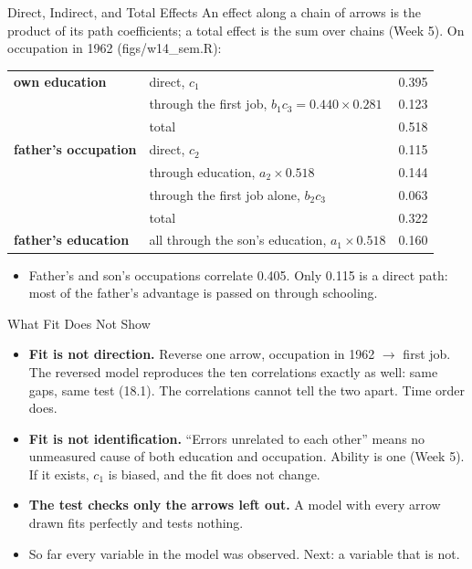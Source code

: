 \documentclass[aspectratio=169,11pt,xcolor=dvipsnames]{beamer}
\newcommand{\srcp}[1]{{\scriptsize\color{gray}(#1)}}
\begin{document}
\begin{frame}{Direct, Indirect, and Total Effects}
An effect along a chain of arrows is the product of its path coefficients; a total effect is the
sum over chains (Week 5). On occupation in 1962 \srcp{figs/w14\_sem.R}:
\begin{center}\small
\renewcommand{\arraystretch}{1.12}
\begin{tabular}{@{}llc@{}}
\toprule
\textbf{own education} & direct, $c_1$ & 0.395 \\
 & through the first job, $b_1 c_3 = 0.440 \times 0.281$ & 0.123 \\
 & total & 0.518 \\
\midrule
\textbf{father's occupation} & direct, $c_2$ & 0.115 \\
 & through education, $a_2 \times 0.518$ & 0.144 \\
 & through the first job alone, $b_2 c_3$ & 0.063 \\
 & total & 0.322 \\
\midrule
\textbf{father's education} & all through the son's education, $a_1 \times 0.518$ & 0.160 \\
\bottomrule
\end{tabular}
\end{center}
\begin{itemize}\itemsep3pt
  \item Father's and son's occupations correlate 0.405. Only 0.115 is a direct path: most of the
        father's advantage is passed on through schooling.
\end{itemize}
\end{frame}

\begin{frame}{What Fit Does Not Show}
\begin{itemize}\itemsep8pt
  \item \textbf{Fit is not direction.} Reverse one arrow, occupation in 1962 $\to$ first job. The
        reversed model reproduces the ten correlations exactly as well: same gaps, same test
        (18.1). The correlations cannot tell the two apart. Time order does.
  \item \textbf{Fit is not identification.} ``Errors unrelated to each other'' means no unmeasured
        cause of both education and occupation. Ability is one (Week 5). If it exists, $c_1$ is
        biased, and the fit does not change.
  \item \textbf{The test checks only the arrows left out.} A model with every arrow drawn fits
        perfectly and tests nothing.
  \item So far every variable in the model was observed. Next: a variable that is not.
\end{itemize}
\end{frame}
\end{document}
